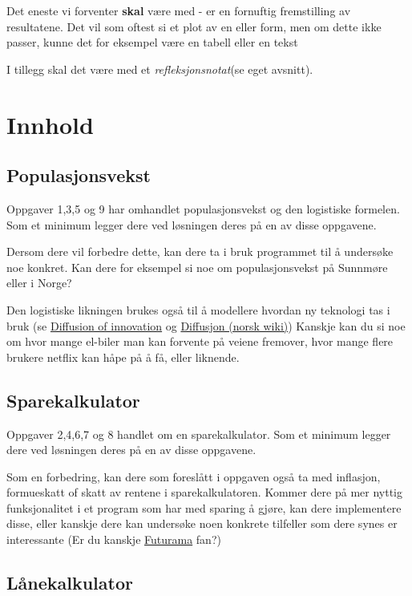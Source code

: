 \documentclass[12pt, titlepage]{article}
\begin{document}
Det eneste vi forventer \textbf{skal} være med - er en fornuftig fremstilling av resultatene.
Det vil som oftest si et plot av en eller form, men om dette ikke passer, kunne det for eksempel
være en tabell eller en tekst 


I tillegg skal det være med et \textit{refleksjonsnotat}(se eget avsnitt).

\section*{Innhold}
\subsection*{Populasjonsvekst}
Oppgaver 1,3,5 og 9 har omhandlet populasjonsvekst og den logistiske formelen.
Som et minimum legger dere ved løsningen deres på en av disse oppgavene.

Dersom dere vil forbedre dette, kan dere ta i bruk programmet til å undersøke noe konkret.
Kan dere for eksempel si noe om populasjonsvekst på Sunnmøre eller i Norge?

Den logistiske likningen brukes også til å modellere hvordan ny teknologi tas i bruk (se \href{https://en.wikipedia.org/wiki/Diffusion_of_innovations}{Diffusion of innovation} og \href{https://no.wikipedia.org/wiki/Diffusjon_(kommunikasjon)}{Diffusjon (norsk wiki)})
Kanskje kan du si noe om hvor mange el-biler man kan forvente på veiene fremover, hvor mange flere brukere netflix kan håpe på å få, eller liknende.

\subsection*{Sparekalkulator}

Oppgaver 2,4,6,7 og 8 handlet om en sparekalkulator.
Som et minimum legger dere ved løsningen deres på en av disse oppgavene.

Som en forbedring, kan dere som foreslått i oppgaven også ta med inflasjon, formueskatt of skatt av rentene i sparekalkulatoren.
Kommer dere på mer nyttig funksjonalitet i et program som har med sparing å gjøre, kan dere implementere disse,
eller kanskje dere kan undersøke noen konkrete tilfeller som dere synes er interessante (Er du kanskje \href{https://www.imdb.com/title/tt0584425/}{Futurama} fan?)

\subsection*{Lånekalkulator}
\end{document}
